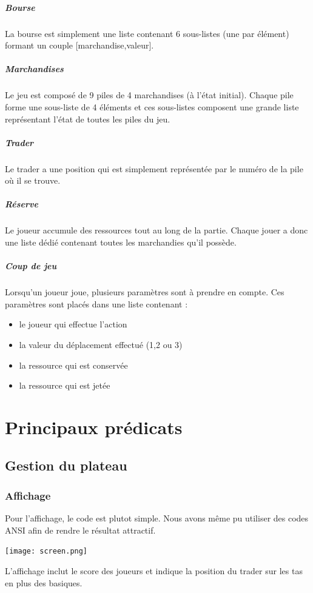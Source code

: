 \documentclass[11pt,a4paper,twoside,french,svgnames]{report}
\begin{document}
\paragraph{Bourse} La bourse est simplement une liste contenant 6 sous-listes (une par élément) formant un couple [marchandise,valeur].
\paragraph{Marchandises} Le jeu est composé de 9 piles de 4 marchandises (à l'état initial). Chaque pile forme une sous-liste de 4 éléments et ces sous-listes composent une grande liste représentant l'état de toutes les piles du jeu.
\paragraph{Trader} Le trader a une position qui est simplement représentée par le numéro de la pile où il se trouve.
\paragraph{Réserve}Le joueur accumule des ressources tout au long de la partie. Chaque jouer a donc une liste dédié contenant toutes les marchandies qu'il possède.
\paragraph{Coup de jeu}Lorsqu'un joueur joue, plusieurs paramètres sont à prendre en compte. Ces paramètres sont placés dans une liste contenant :
\begin{itemize}
	\item le joueur qui effectue l'action
    \item la valeur du déplacement effectué (1,2 ou 3)
    \item la ressource qui est conservée
    \item la ressource qui est jetée
\end{itemize}


\chapter{Principaux prédicats}
\section{Gestion du plateau}
\subsection{Affichage}
Pour l'affichage, le code est plutot simple. Nous avons même pu utiliser des codes ANSI afin de rendre le résultat attractif.
\begin{center}
\texttt{[image: screen.png]}\\
\end{center}
L'affichage inclut le score des joueurs et indique la position du trader sur les tas en plus des basiques.
\end{document}
